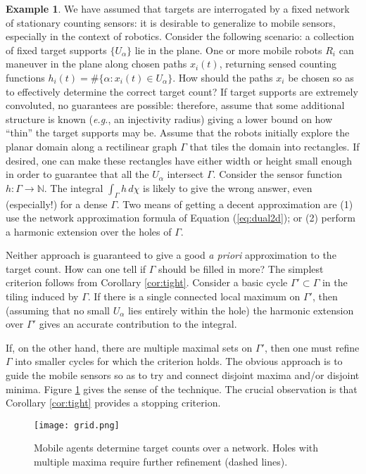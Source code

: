 \documentclass{psapm-l}
\theoremstyle{definition}
\newtheorem{example}[theorem]{Example}
\theoremstyle{remark}
\numberwithin{equation}{section}
\begin{document}
\begin{example}
We have assumed that targets are interrogated by a fixed network of stationary counting sensors: it is desirable to generalize to mobile sensors, especially in the context of robotics. Consider the following scenario: a collection of fixed target supports $\{U_\alpha\}$ lie in the plane. One or more mobile robots $R_i$ can maneuver in the plane along chosen paths $x_i(t)$, returning sensed counting functions $h_i(t)=\#\{\alpha: x_i(t)\in U_\alpha\}$. How should the paths $x_i$ be chosen so as to effectively determine the correct target count? If target supports are extremely convoluted, no guarantees are possible: therefore, assume that some additional structure is known ({{\em e.g.}}, an injectivity radius) giving a lower bound on how ``thin'' the target supports may be. Assume that the robots initially explore the planar domain along a rectilinear graph $\Gamma$ that tiles the domain into rectangles. If desired, one can make these rectangles have either width or height small enough in order to guarantee that all the $U_\alpha$ intersect $\Gamma$. Consider the sensor function $h\colon\Gamma\to{{\mathbb N}}$. The integral $\int_\Gamma h\,d\chi$ is likely to give the wrong answer, even (especially!) for a dense $\Gamma$. Two means of getting a decent approximation are (1) use the network approximation formula of Equation (\ref{eq:dual2d}); or (2) perform a harmonic extension over the holes of $\Gamma$.

Neither approach is guaranteed to give a good {\em a priori} approximation to the target count. How can one tell if $\Gamma$ should be filled in more? The simplest criterion follows from Corollary \ref{cor:tight}. Consider a basic cycle $\Gamma'\subset\Gamma$ in the tiling induced by $\Gamma$. If there is a single connected local maximum on $\Gamma'$, then (assuming that no small $U_\alpha$ lies entirely within the hole) the harmonic extension over $\Gamma'$ gives an accurate contribution to the integral.

If, on the other hand, there are multiple maximal sets on $\Gamma'$, then one must refine $\Gamma$ into smaller cycles for which the criterion holds. The obvious approach is to guide the mobile sensors so as to try and connect disjoint maxima and/or disjoint minima. Figure \ref{fig:grid} gives the sense of the technique. The crucial observation is that Corollary \ref{cor:tight} provides a stopping criterion.
\end{example}

\begin{figure}[hbt]
\begin{center}
\texttt{[image: grid.png]}
\caption{Mobile agents determine target counts over a network. Holes with multiple maxima require further refinement (dashed lines).}
\label{fig:grid}
\end{center}
\end{figure}
\end{document}
